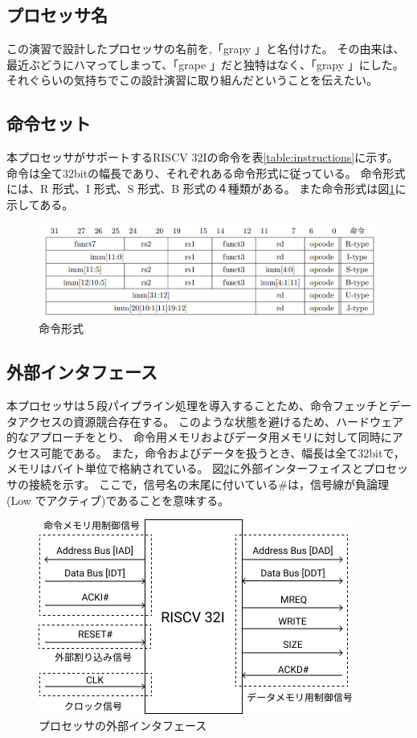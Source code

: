 \documentclass[../main.tex]{subfiles}
\begin{document}
    \subsection{プロセッサ名}
        この演習で設計したプロセッサの名前を,「grapy 」と名付けた。
        その由来は、最近ぶどうにハマってしまって、「grape 」だと独特はなく、「grapy 」にした。
        それぐらいの気持ちでこの設計演習に取り組んだということを伝えたい。

    \subsection{命令セット}
        本プロセッサがサポートするRISCV 32Iの命令を表\ref{table:instructions}に示す。
        命令は全て32bitの幅長であり、それぞれある命令形式に従っている。
        命令形式には、R 形式、I 形式、S 形式、B 形式の４種類がある。
        また命令形式は図\ref{fig:inst}に示してある。
        \begin{figure}[h]
            \centering
            \includegraphics[width = 1.5\columnwidth]{../images/insts.png}
            \caption{命令形式}
            \label{fig:inst}
        \end{figure}
        

    \subsection{外部インタフェース}
    本プロセッサは５段パイプライン処理を導入することため、命令フェッチとデータアクセスの資源競合存在する。
    このような状態を避けるため、ハードウェア的なアプローチをとり、
    命令用メモリおよびデータ用メモリに対して同時にアクセス可能である。
    また，命令およびデータを扱うとき、幅長は全て32bitで，メモリはバイト単位で格納されている。
    図\ref{fig:processor}に外部インターフェイスとプロセッサの接続を示す。
    ここで，信号名の末尾に付いている$\#$は，信号線が負論理(Low でアクティブ)であることを意味する。

    \begin{figure}[h]
        \centering
        \includegraphics[width = 1.3\columnwidth]{../images/cpu.png}
        \caption{プロセッサの外部インタフェース}
        \label{fig:processor}
    \end{figure}
\end{document}
